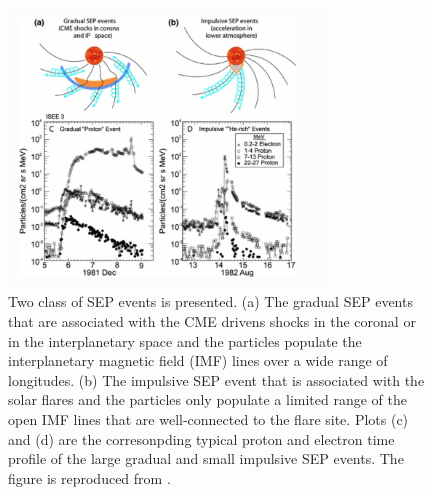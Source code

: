 \begin{figure}
	\centering
	\includegraphics[width = 0.75\textwidth]{images/SEP_two_type.png}
	\caption[Two type of Solar energetic particle (SEP) event]{Two class of SEP events is presented. (a) The gradual SEP events that are associated with the CME drivens shocks in the coronal or in the interplanetary space and the particles populate the interplanetary magnetic field (IMF) lines over a wide range of longitudes. (b) The impulsive SEP event that is associated with the solar flares and the particles only populate a limited range of the open IMF lines that are well-connected to the flare site. Plots (c) and (d) are the corresonpding typical proton and electron time profile of the large gradual and small impulsive SEP events. The figure is reproduced from \citet{Desai_Diacalone2016LRSP}.}
	\label{Fig:two_type_SEP}
\end{figure}


